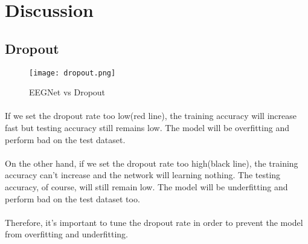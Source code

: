 \section{Discussion}
\subsection{Dropout}
\begin{figure}[!ht]
    \begin{center} 
        \texttt{[image: dropout.png]} 
        \caption{EEGNet vs Dropout}
    \end{center} 
\end{figure}
\paragraph{}
If we set the dropout rate too low(red line), the training accuracy will increase fast but testing accuracy still remains low. The model will be overfitting and perform bad on the test dataset.
\paragraph{}
On the other hand, if we set the dropout rate too high(black line), the training accuracy can't increase and the network will learning nothing. The testing accuracy, of course, will still remain low. The model will be underfitting and perform bad on the test dataset too.
\paragraph{}
Therefore, it's important to tune the dropout rate in order to prevent the model from overfitting and underfitting.
